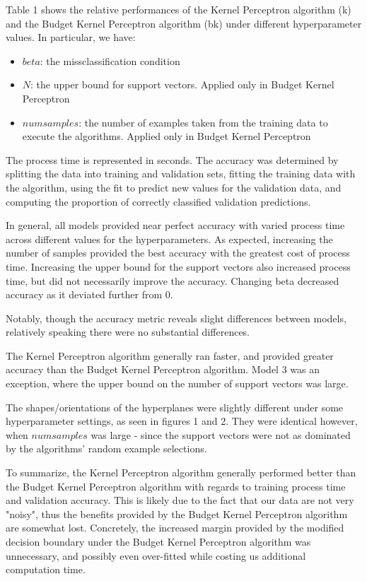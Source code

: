 \documentclass[submit]{harvardml}
\begin{document}
Table 1 shows the relative performances of the Kernel Perceptron algorithm (k) and the Budget Kernel Perceptron algorithm (bk) under different hyperparameter values. In particular, we have:

\begin{itemize}
	\item $beta$: the missclassification condition
	\item $N$: the upper bound for support vectors. Applied only in Budget Kernel Perceptron
	\item $numsamples$: the number of examples taken from the training data to execute the algorithms. Applied only in Budget Kernel Perceptron
\end{itemize}

The process time is represented in seconds. The accuracy was determined by splitting the data into training and validation sets, fitting the training data with the algorithm, using the fit to predict new values for the validation data, and computing the proportion of correctly classified validation predictions.

In general, all models provided near perfect accuracy with varied process time across different values for the hyperparameters. As expected, increasing the number of samples provided the best accuracy with the greatest cost of process time. Increasing the upper bound for the support vectors also increased process time, but did not necessarily improve the accuracy. Changing beta decreased accuracy as it deviated further from 0.

Notably, though the accuracy metric reveals slight differences between models, relatively speaking there were no substantial differences. 

The Kernel Perceptron algorithm generally ran faster, and provided greater accuracy than the Budget Kernel Perceptron algorithm. Model 3 was an exception, where the upper bound on the number of support vectors was large. 

The shapes/orientations of the hyperplanes were slightly different under some hyperparameter settings, as seen in figures 1 and 2. They were identical however, when $numsamples$ was large - since the support vectors were not as dominated by the algorithms' random example selections. 

To summarize, the Kernel Perceptron algorithm generally performed better than the Budget Kernel Perceptron algorithm with regards to training process time and validation accuracy. This is likely due to the fact that our data are not very "noisy", thus the benefits provided by the Budget Kernel Perceptron algorithm are somewhat lost. Concretely, the increased margin provided by the modified decision boundary under the Budget Kernel Perceptron algorithm was unnecessary, and possibly even over-fitted while costing us additional computation time.
\end{document}
